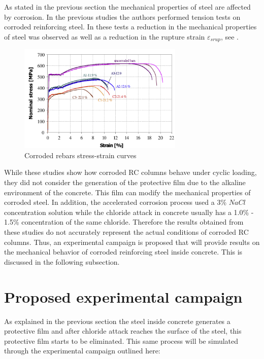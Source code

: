 As stated in the previous section the mechanical properties of steel are affected by corrosion. In the previous studies \cite{Meda2014} the authors performed tension tests on corroded reinforcing steel. In these tests a reduction in the mechanical properties of steel was observed as well as a reduction in the rupture strain $\varepsilon_{srup}$, see . 

\begin{figure}[htbp]
	\centering
	\includegraphics[width=0.7\textwidth]{Chapter-4/figs/Meda_StressStrain}
	\caption{Corroded rebars stress-strain curves \cite{Meda2014}}
	\label{fig:Meda_RebarTest}
\end{figure}

While these studies show how corroded RC columns behave under cyclic loading, they did not consider the generation of the protective film due to the alkaline environment of the concrete. This film can modify the mechanical properties of corroded steel. In addition, the accelerated corrosion process used a 3\% $NaCl$ concentration solution while the chloride attack in concrete usually has a 1.0\% - 1.5\% concentration of the same chloride. Therefore the results obtained from these studies do not accurately represent the actual conditions of corroded RC columns. Thus, an experimental campaign is proposed that will provide results on the mechanical behavior of corroded reinforcing steel inside concrete. This is discussed in the following subsection.

\section{Proposed experimental campaign}

As explained in the previous section the steel inside concrete generates a protective film and after chloride attack reaches the surface of the steel, this protective film starts to be eliminated. This same process will be simulated through the experimental campaign outlined here:

